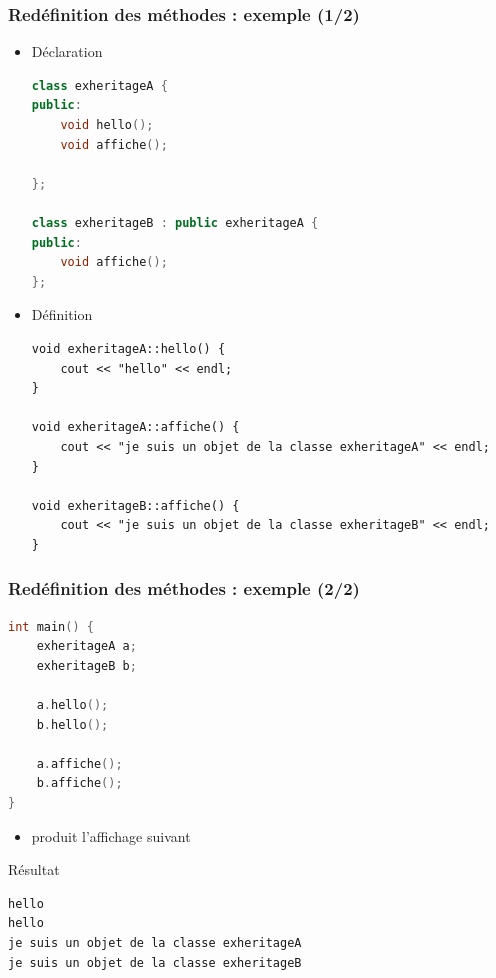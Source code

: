 \begin{frame}[fragile]
\frametitle{{\href{code/exheritageA.cxx}{}} Redéfinition des méthodes : exemple (1/2)}
\begin{itemize}
\item Déclaration
\begin{lstlisting}[language=C++]
class exheritageA {
public:
    void hello();
    void affiche();

};

class exheritageB : public exheritageA {
public:
    void affiche();
};
\end{lstlisting}
\item Définition
\begin{lstlisting}
void exheritageA::hello() {
    cout << "hello" << endl;
}

void exheritageA::affiche() {
    cout << "je suis un objet de la classe exheritageA" << endl;
}

void exheritageB::affiche() {
    cout << "je suis un objet de la classe exheritageB" << endl;
}
\end{lstlisting}
\end{itemize}
\end{frame}
%
\begin{frame}
\frametitle{{\href{code/exheritageB.java}{}}  Redéfinition des méthodes : exemple (2/2)}
\begin{lstlisting}[language=C++]
int main() {
    exheritageA a;
    exheritageB b;

    a.hello();
    b.hello();

    a.affiche();
    b.affiche();
}
\end{lstlisting}
\begin{itemize}
	\item produit l'affichage suivant
\end{itemize}
\pause \begin{block}{Résultat}
{\tiny \begin{verbatim}
hello
hello
je suis un objet de la classe exheritageA
je suis un objet de la classe exheritageB
\end{verbatim}}
\end{block}
\end{frame}
